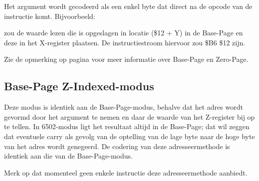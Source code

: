 Het argument wordt gecodeerd als een enkel byte dat direct na de opcode van de instructie komt. Bijvoorbeeld:


zou de waarde lezen die is opgeslagen in locatie (\$12 + Y) in de Base-Page en deze in het X-register plaatsen. De instructiestroom hiervoor zou \$B6 \$12 zijn.

Zie de opmerking op pagina \pageref{Base-Page (Zero-Page) Mode} voor meer informatie over Base-Page en Zero-Page.

\iffalse
\subsection{Base-Page Z-Indexed-modus}

Deze modus is identiek aan de Base-Page-modus, behalve dat het adres wordt gevormd door het argument te nemen en daar de waarde van het Z-register bij op te tellen. In 6502-modus ligt het resultaat altijd in de Base-Page; dat wil zeggen dat eventuele carry als gevolg van de optelling van de lage byte naar de hoge byte van het adres wordt genegeerd. De codering van deze adresseermethode is identiek aan die van de Base-Page-modus.

Merk op dat momenteel geen enkele instructie deze adresseermethode aanbiedt.

